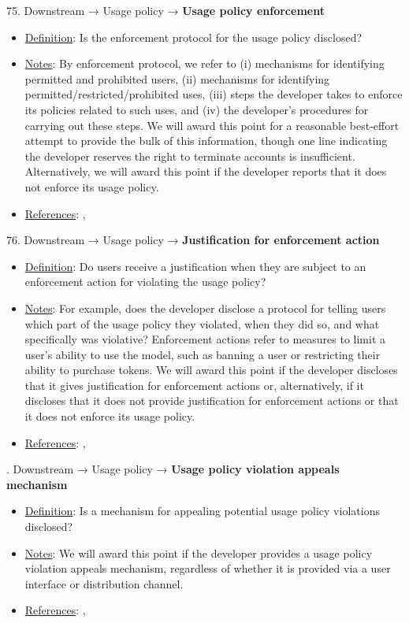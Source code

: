 75. Downstream → Usage policy → \textbf{Usage policy enforcement}
\vspace{-\parskip}
\begin{itemize}
	\item
	\underline{Definition}: Is the enforcement protocol for the usage policy disclosed?
	\item
	\underline{Notes}: By enforcement protocol, we refer to (i) mechanisms for identifying permitted and prohibited users, (ii) mechanisms for identifying permitted/restricted/prohibited uses, (iii) steps the developer takes to enforce its policies related to such uses, and (iv) the developer’s procedures for carrying out these steps. We will award this point for a reasonable best-effort attempt to provide the bulk of this information, though one line indicating the developer reserves the right to terminate accounts is insufficient. Alternatively, we will award this point if the developer reports that it does not enforce its usage policy.
	\item
	\underline{References}: \citet{cohere2022}, \citet{meta2023}
\end{itemize}


76. Downstream → Usage policy → \textbf{Justification for enforcement action}
\vspace{-\parskip}
\begin{itemize}
	\item
	\underline{Definition}: Do users receive a justification when they are subject to an enforcement action for violating the usage policy?
	\item
	\underline{Notes}: For example, does the developer disclose a protocol for telling users which part of the usage policy they violated, when they did so, and what specifically was violative? Enforcement actions refer to measures to limit a user’s ability to use the model, such as banning a user or restricting their ability to purchase tokens. We will award this point if the developer discloses that it gives justification for enforcement actions or, alternatively, if it discloses that it does not provide justification for enforcement actions or that it does not enforce its usage policy.
	\item
	\underline{References}: \citet{cohere2022}, \citet{meta2023}
\end{itemize}


. Downstream → Usage policy → \textbf{Usage policy violation appeals mechanism}
\vspace{-\parskip}
\begin{itemize}
	\item
	\underline{Definition}: Is a mechanism for appealing potential usage policy violations disclosed?
	\item
	\underline{Notes}: We will award this point if the developer provides a usage policy violation appeals mechanism, regardless of whether it is provided via a user interface or distribution channel.
	\item
	\underline{References}: \citet{cohere2022}, \citet{meta2023}
\end{itemize}


